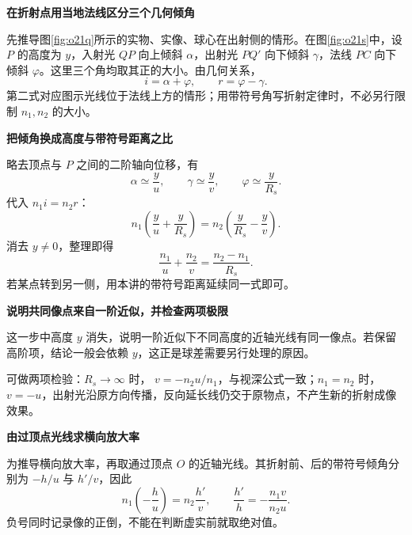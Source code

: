 \begin{solution}\textbf{在折射点用当地法线区分三个几何倾角}\par\nobreak
先推导图\ref{fig:o21q}所示的实物、实像、球心在出射侧的情形。在图\ref{fig:o21s}中，设 \(P\) 的高度为 \(y\)，入射光 \(QP\) 向上倾斜 \(\alpha\)，出射光 \(PQ'\) 向下倾斜 \(\gamma\)，法线 \(PC\) 向下倾斜 \(\varphi\)。这里三个角均取其正的大小。由几何关系，
\[
 i=\alpha+\varphi,\qquad r=\varphi-\gamma.
\]
第二式对应图示光线位于法线上方的情形；用带符号角写折射定律时，不必另行限制 \(n_1,n_2\) 的大小。




\par\medskip{}\noindent\textbf{把倾角换成高度与带符号距离之比}\par\nobreak
略去顶点与 \(P\) 之间的二阶轴向位移，有
\[
 \alpha\simeq\frac y u,\qquad
 \gamma\simeq\frac y v,\qquad
 \varphi\simeq\frac y{R_{\!s}}.
\]
代入 \(n_1i=n_2r\)：
\[
 n_1\left(\frac y u+\frac y{R_{\!s}}\right)
 =n_2\left(\frac y{R_{\!s}}-\frac y v\right).
\]
消去 \(y\ne0\)，整理即得
\[
 \boxed{\frac{n_1}{u}+\frac{n_2}{v}=\frac{n_2-n_1}{R_{\!s}}}.
\]
若某点转到另一侧，用本讲的带符号距离延续同一式即可。



\par\medskip{}\noindent\textbf{说明共同像点来自一阶近似，并检查两项极限}\par\nobreak
这一步中高度 \(y\) 消失，说明一阶近似下不同高度的近轴光线有同一像点。若保留高阶项，结论一般会依赖 \(y\)，这正是球差需要另行处理的原因。

可做两项检验：\(R_{\!s}\to\infty\) 时，
\(v=-n_2u/n_1\)，与视深公式一致；\(n_1=n_2\) 时，\(v=-u\)，出射光沿原方向传播，反向延长线仍交于原物点，不产生新的折射成像效果。



\par\medskip{}\noindent\textbf{由过顶点光线求横向放大率}\par\nobreak
为推导横向放大率，再取通过顶点 \(O\) 的近轴光线。其折射前、后的带符号倾角分别为 \(-h/u\) 与 \(h'/v\)，因此
\[
 n_1\left(-\frac h u\right)=n_2\frac{h'}v,
 \qquad \frac{h'}h=-\frac{n_1v}{n_2u}.
\]
负号同时记录像的正倒，不能在判断虚实前就取绝对值。
\end{solution}

